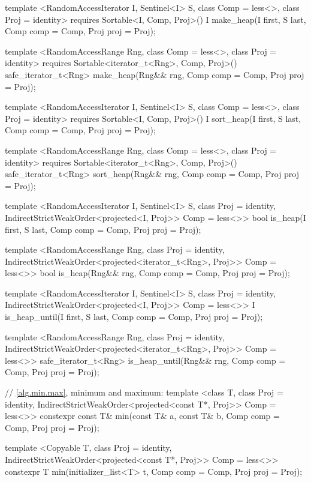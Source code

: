 \begin{codeblock}
{{{{  template <RandomAccessIterator I, Sentinel<I> S, class Comp = less<>,
      class Proj = identity>
    requires Sortable<I, Comp, Proj>()
    I make_heap(I first, S last, Comp comp = Comp{}, Proj proj = Proj{});

  template <RandomAccessRange Rng, class Comp = less<>, class Proj = identity>
    requires Sortable<iterator_t<Rng>, Comp, Proj>()
    safe_iterator_t<Rng>
      make_heap(Rng&& rng, Comp comp = Comp{}, Proj proj = Proj{});

  template <RandomAccessIterator I, Sentinel<I> S, class Comp = less<>,
      class Proj = identity>
    requires Sortable<I, Comp, Proj>()
    I sort_heap(I first, S last, Comp comp = Comp{}, Proj proj = Proj{});

  template <RandomAccessRange Rng, class Comp = less<>, class Proj = identity>
    requires Sortable<iterator_t<Rng>, Comp, Proj>()
    safe_iterator_t<Rng>
      sort_heap(Rng&& rng, Comp comp = Comp{}, Proj proj = Proj{});

  template <RandomAccessIterator I, Sentinel<I> S, class Proj = identity,
      IndirectStrictWeakOrder<projected<I, Proj>> Comp = less<>>
    bool is_heap(I first, S last, Comp comp = Comp{}, Proj proj = Proj{});

  template <RandomAccessRange Rng, class Proj = identity,
      IndirectStrictWeakOrder<projected<iterator_t<Rng>, Proj>> Comp = less<>>
    bool
      is_heap(Rng&& rng, Comp comp = Comp{}, Proj proj = Proj{});

  template <RandomAccessIterator I, Sentinel<I> S, class Proj = identity,
      IndirectStrictWeakOrder<projected<I, Proj>> Comp = less<>>
    I is_heap_until(I first, S last, Comp comp = Comp{}, Proj proj = Proj{});

  template <RandomAccessRange Rng, class Proj = identity,
      IndirectStrictWeakOrder<projected<iterator_t<Rng>, Proj>> Comp = less<>>
    safe_iterator_t<Rng>
      is_heap_until(Rng&& rng, Comp comp = Comp{}, Proj proj = Proj{});

  // \ref{alg.min.max}, minimum and maximum:
  template <class T, class Proj = identity,
      IndirectStrictWeakOrder<projected<const T*, Proj>> Comp = less<>>
    constexpr const T& min(const T& a, const T& b, Comp comp = Comp{}, Proj proj = Proj{});

  template <Copyable T, class Proj = identity,
      IndirectStrictWeakOrder<projected<const T*, Proj>> Comp = less<>>
    constexpr T min(initializer_list<T> t, Comp comp = Comp{}, Proj proj = Proj{});

}}}}
\end{codeblock}
